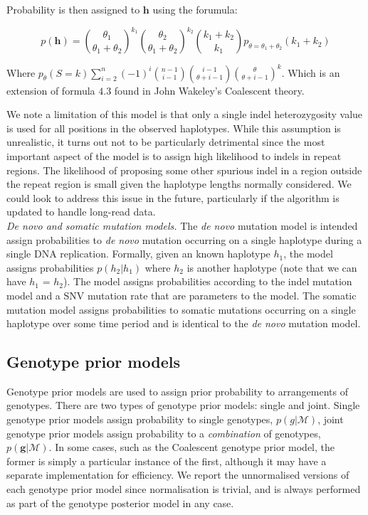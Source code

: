 \documentclass[notitlepage, twocolumn]{article}
\begin{document}
Probability is then assigned to $\boldsymbol{h}$ using the forumula:

\begin{equation*}
    p(\boldsymbol{h}) = \binom{\theta_1}{\theta_1 + \theta_2}^{k_1} \binom{\theta_2}{\theta_1 + \theta_2}^{k_2} \binom{k_1 + k_2}{k_1} p_{\theta = \theta_1 + \theta_2} (k_1 + k_2)
\end{equation*}

Where $p_\theta(S = k)\sum_{i=2}^n (-1)^i \binom{n - 1}{i - 1} \binom{i - 1}{\theta + i - 1} \binom{\theta}{\theta + i - 1}^k$. Which is an extension of formula $4.3$ found in John Wakeley's Coalescent theory.

We note a limitation of this model is that only a single indel heterozygosity value is used for all positions in the observed haplotypes. While this assumption is unrealistic, it turns out not to be particularly detrimental since the most important aspect of the model is to assign high likelihood to indels in repeat regions. The likelihood of proposing some other spurious indel in a region outside the repeat region is small given the haplotype lengths normally considered. We could look to address this issue in the future, particularly if the algorithm is updated to handle long-read data.\\

\emph{De novo and somatic mutation models.} The \textit{de novo} mutation model is intended assign probabilities to \textit{de novo} mutation occurring on a single haplotype during a single DNA replication. Formally, given an known haplotype $h_1$, the model assigns probabilities $p(h_2 | h_1)$ where $h_2$ is another haplotype (note that we can have $h_1$ = $h_2$). The model assigns probabilities according to the indel mutation model and a SNV mutation rate that are parameters to the model. The somatic mutation model assigns probabilities to somatic mutations occurring on a single haplotype over some time period and is identical to the \textit{de novo} mutation model.

\subsection*{Genotype prior models}

Genotype prior models are used to assign prior probability to arrangements of genotypes. There are two types of genotype prior models: single and joint. Single genotype prior models assign probability to single genotypes, $p(g | \mathcal{M})$, joint genotype prior models assign probability to a \emph{combination} of genotypes, $p(\boldsymbol{g} | \mathcal{M})$. In some cases, such as the Coalescent genotype prior model, the former is simply a particular instance of the first, although it may have a separate implementation for efficiency. We report the unnormalised versions of each genotype prior model since normalisation is trivial, and is always performed as part of the genotype posterior model in any case.\\
\end{document}
